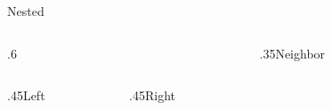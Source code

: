 \documentclass{beamer}
\date{}
\begin{document}
\begin{frame}[t]{Nested}
\begin{columns}[onlytextwidth,T]
\begin{column}{.6\textwidth}
\begin{columns}[onlytextwidth,T]
\begin{column}{.45\textwidth}Left\end{column}
\begin{column}{.45\textwidth}Right\end{column}
\end{columns}
\end{column}
\begin{column}{.35\textwidth}Neighbor\end{column}
\end{columns}
\end{frame}
\end{document}
